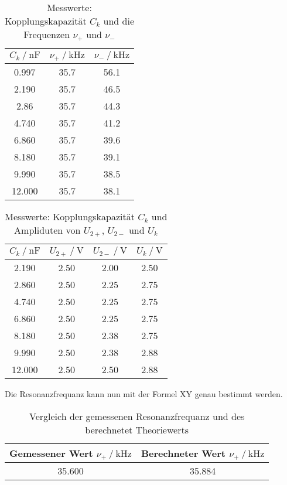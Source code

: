 \begin{table}
  \centering
  \caption{Messwerte: Kopplungskapazität $C_k $ und die Frequenzen $\nu _+$ und $\nu _-$}
  \label{tab:frequenzen}
  \begin{tabular}{c c c}
    \toprule 
    $C_k \:/\: \si{\nano\farad}$ & $\nu _+ \:/\: \si{\kilo\hertz}$ & $\nu _- \:/\: \si{\kilo\hertz}$   \\ 
    \midrule 
    0.997 & 35.7 & 56.1 \\
    2.190 & 35.7 & 46.5 \\
    2.86 & 35.7 & 44.3 \\
    4.740 & 35.7 & 41.2 \\
    6.860 & 35.7 & 39.6 \\
    8.180 & 35.7 & 39.1 \\
    9.990 & 35.7 & 38.5 \\
    12.000 & 35.7 & 38.1 \\
    \bottomrule
  \end{tabular}
\end{table}



\begin{table}
  \centering
  \caption{Messwerte: Kopplungskapazität $C_k $ und Ampliduten von $U_{2+}$, $U_{2-}$ und $U_k$}
  \label{tab:amplituden}
  \begin{tabular}{c c c c}
    \toprule 
    $C_k \:/\: \si{\nano\farad}$ & $U_{2+} \:/\: \si{\volt}$ & $U_{2-} \:/\: \si{\volt}$ &  $U_k \:/\: \si{\volt}$       \\ 
    \midrule 
    2.190 & 2.50 & 2.00 & 2.50 \\
    2.860 & 2.50 & 2.25 & 2.75 \\
    4.740 & 2.50 & 2.25 & 2.75 \\
    6.860 & 2.50 & 2.25 & 2.75 \\
    8.180 & 2.50 & 2.38 & 2.75 \\
    9.990 & 2.50 & 2.38 & 2.88 \\
    12.000 & 2.50 & 2.50 & 2.88 \\
    \bottomrule
  \end{tabular}
\end{table}

Die Resonanzfrequanz kann nun mit der Formel XY genau bestimmt werden.

\begin{table}
  \centering
  \caption{Vergleich der gemessenen Resonanzfrequanz und des berechnetet Theoriewerts}
  \label{tab:resonanz}
  \begin{tabular}{c c}
    \toprule 
    Gemessener Wert $\nu _+ \:/\: \si{\kilo\hertz}$ & Berechneter Wert $\nu _+ \:/\: \si{\kilo\hertz}$    \\ 
    \midrule 
    35.600 & 35.884 \\
    \bottomrule
  \end{tabular}
\end{table}

